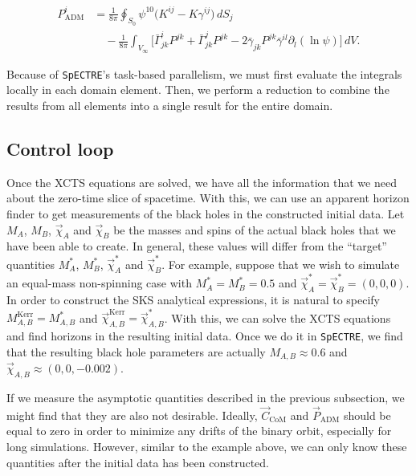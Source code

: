 \documentclass{../document}
\begin{document}
      \begin{equation} \label{eq:Padm-mixed}
        \begin{aligned}
          P_\text{ADM}^i
          &= \frac{1}{8\pi}
              \oint_{S_0} \psi^{10} \Big(
                K^{ij} - K \gamma^{ij}
              \Big) \, dS_j \\
            &\quad - \frac{1}{8\pi}
              \int_{V_\infty} \Big[
                \bar\Gamma^i_{jk} P^{jk}
                + \bar\Gamma^j_{jk} P^{jk}
                - 2 \bar\gamma_{jk} P^{jk} \bar\gamma^{il}
                                          \partial_l(\ln\psi)
              \Big] \, dV.
        \end{aligned}
      \end{equation}

      Because of {\tt SpECTRE}'s task-based parallelism, we must first evaluate the integrals locally in each domain element. Then, we perform a reduction to combine the results from all elements into a single result for the entire domain.

    \subsection{Control loop}
      
      Once the XCTS equations are solved, we have all the information that we need about the zero-time slice of spacetime. With this, we can use an apparent horizon finder to get measurements of the black holes in the constructed initial data. Let $M_A$, $M_B$, $\vec\chi_{A}$ and $\vec\chi_{B}$ be the masses and spins of the actual black holes that we have been able to create. In general, these values will differ from the ``target'' quantities $M^*_A$, $M^*_B$, $\vec\chi^*_{A}$ and $\vec\chi^*_{B}$. For example, suppose that we wish to simulate an equal-mass non-spinning case with $M^*_A = M^*_B = 0.5$ and $\vec\chi^*_{A} = \vec\chi^*_{B} = (0,0,0)$. In order to construct the SKS analytical expressions, it is natural to specify $M^\text{Kerr}_{A,B} = M^*_{A,B}$ and $\vec\chi^\text{Kerr}_{A,B} = \vec\chi^*_{A,B}$. With this, we can solve the XCTS equations and find horizons in the resulting initial data. Once we do it in {\tt SpECTRE}, we find that the resulting black hole parameters are actually $M_{A,B} \approx 0.6$ and $\vec\chi_{A,B} \approx (0,0,-0.002)$.

      If we measure the asymptotic quantities described in the previous subsection, we might find that they are also not desirable. Ideally, $\vec C_\text{CoM}$ and $\vec P_\text{ADM}$ should be equal to zero in order to minimize any drifts of the binary orbit, especially for long simulations. However, similar to the example above, we can only know these quantities after the initial data has been constructed.
\end{document}
